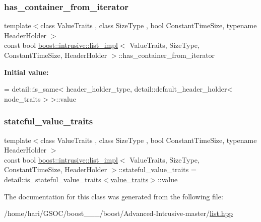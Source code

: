 \subsubsection{\texorpdfstring{has\+\_\+container\+\_\+from\+\_\+iterator}{has\_container\_from\_iterator}}
{\footnotesize\ttfamily template$<$class Value\+Traits , class Size\+Type , bool Constant\+Time\+Size, typename Header\+Holder $>$ \\
const bool \hyperlink{classboost_1_1intrusive_1_1list__impl}{boost\+::intrusive\+::list\+\_\+impl}$<$ Value\+Traits, Size\+Type, Constant\+Time\+Size, Header\+Holder $>$\+::has\+\_\+container\+\_\+from\+\_\+iterator\hspace{0.3cm}{\ttfamily [static]}}

{\bfseries Initial value\+:}
\begin{DoxyCode}
=
        detail::is\_same< header\_holder\_type, detail::default\_header\_holder< node\_traits > >::value
\end{DoxyCode}
\mbox{\label{classboost_1_1intrusive_1_1list__impl_ab2af39c13da3c2bd169d47f39d501a26}} 
\subsubsection{\texorpdfstring{stateful\+\_\+value\+\_\+traits}{stateful\_value\_traits}}
{\footnotesize\ttfamily template$<$class Value\+Traits , class Size\+Type , bool Constant\+Time\+Size, typename Header\+Holder $>$ \\
const bool \hyperlink{classboost_1_1intrusive_1_1list__impl}{boost\+::intrusive\+::list\+\_\+impl}$<$ Value\+Traits, Size\+Type, Constant\+Time\+Size, Header\+Holder $>$\+::stateful\+\_\+value\+\_\+traits = detail\+::is\+\_\+stateful\+\_\+value\+\_\+traits$<$\hyperlink{classboost_1_1intrusive_1_1list__impl_a5cd55672f6df367749d91ef708834126}{value\+\_\+traits}$>$\+::value\hspace{0.3cm}{\ttfamily [static]}}



The documentation for this class was generated from the following file\+:\begin{DoxyCompactItemize}
\item 
/home/hari/\+G\+S\+O\+C/boost\+\_\+\_\+\_/boost/\+Advanced-\/\+Intrusive-\/master/\hyperlink{list_8hpp}{list.\+hpp}\end{DoxyCompactItemize}

